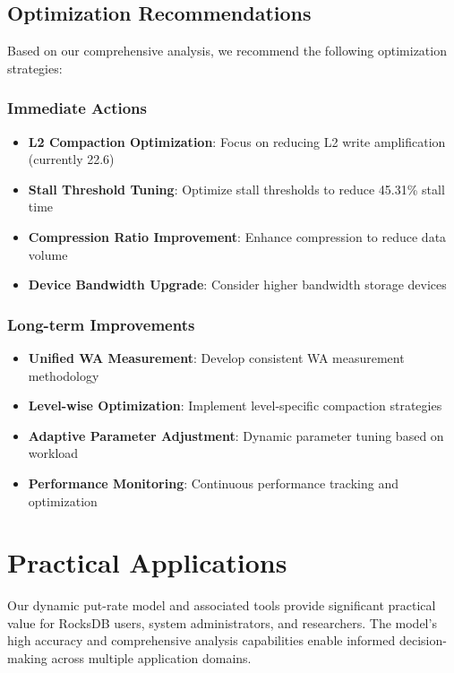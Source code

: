 \documentclass[11pt]{article}
\begin{document}
\subsection{Optimization Recommendations}

Based on our comprehensive analysis, we recommend the following optimization strategies:

\subsubsection{Immediate Actions}
\begin{itemize}
    \item \textbf{L2 Compaction Optimization}: Focus on reducing L2 write amplification (currently 22.6)
    \item \textbf{Stall Threshold Tuning}: Optimize stall thresholds to reduce 45.31\% stall time
    \item \textbf{Compression Ratio Improvement}: Enhance compression to reduce data volume
    \item \textbf{Device Bandwidth Upgrade}: Consider higher bandwidth storage devices
\end{itemize}

\subsubsection{Long-term Improvements}
\begin{itemize}
    \item \textbf{Unified WA Measurement}: Develop consistent WA measurement methodology
    \item \textbf{Level-wise Optimization}: Implement level-specific compaction strategies
    \item \textbf{Adaptive Parameter Adjustment}: Dynamic parameter tuning based on workload
    \item \textbf{Performance Monitoring}: Continuous performance tracking and optimization
\end{itemize}

\section{Practical Applications}

Our dynamic put-rate model and associated tools provide significant practical value for RocksDB users, system administrators, and researchers. The model's high accuracy and comprehensive analysis capabilities enable informed decision-making across multiple application domains.
\end{document}
